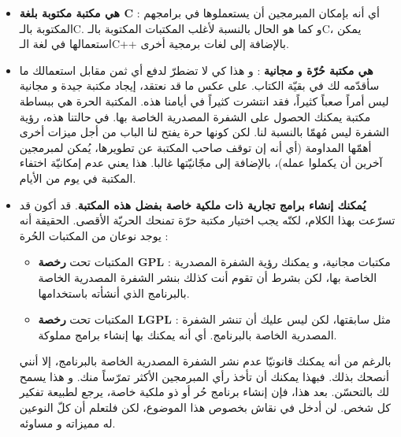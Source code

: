 \begin{itemize}
	\item \textbf{هي مكتبة مكتوبة بلغة
	\textenglish{C}} :
	 أي أنه بإمكان المبرمجين أن يستعملوها في برامجهم المكتوبة بالـ\textenglish{C}.
	 و كما هو الحال بالنسبة لأغلب المكتبات المكتوبة بالـ\textenglish{C}،
	 يمكن استعمالها في لغة الـ\textenglish{C++}
	 بالإضافة إلى لغات برمجية أخرى.
	 \item \textbf{هي مكتبة حُرّة و مجانية} :
و هذا كي لا تضطرّ لدفع أي ثمن مقابل استعمالك ما سأقدّمه لك في بقيّة الكتاب. على عكس ما قد نعتقد، إيجاد مكتبة جيدة و مجانية ليس أمراً صعباً كثيراً، فقد انتشرت كثيراً في أيامنا هذه. المكتبة الحرة هي ببساطة مكتبة يمكنك الحصول على الشفرة المصدرية الخاصة بها. في حالتنا هذه، رؤية الشفرة ليس مُهمّا بالنسبة لنا. لكن كونها حرة يفتح لنا الباب من أجل ميزات أخرى أهمّها المداومة (أي أنه إن توقف صاحب المكتبة عن تطويرها، يُمكن لمبرمجين آخرين أن يكملوا عمله)، بالإضافة إلى مجّانيّتها غالبا. هذا يعني عدم إمكانيّة اختفاء المكتبة في يوم من الأيام.
	 \item \textbf{يُمكنك إنشاء برامج تجارية ذات ملكية خاصة بفضل هذه المكتبة}.
	 قد أكون قد تسرّعت بهذا الكلام، لكنّه يجب اختيار مكتبة حرّة تمنحك الحريّة الأقصى. الحقيقة أنه يوجد نوعان من المكتبات الحُرة :
	 
	 \begin{itemize}
	 	\item المكتبات تحت 
	 	\textbf{رخصة \textenglish{GPL}} :
	 	 مكتبات مجانية، و يمكنك رؤية الشفرة المصدرية الخاصة بها، لكن بشرط أن تقوم أنت كذلك بنشر الشفرة المصدرية الخاصة بالبرنامج الذي أنشأته باستخدامها.
	 	\item المكتبات تحت 
	 	\textbf{رخصة \textenglish{LGPL}} :
	 	مثل سابقتها، لكن ليس عليك أن تنشر الشفرة المصدرية الخاصة بالبرنامج. أي أنه يمكنك بها إنشاء برامج مملوكة.
	 \end{itemize}
 	
 	\begin{information}
بالرغم من أنه يمكنك قانونيّا عدم نشر الشفرة المصدرية الخاصة بالبرنامج، إلا أنني أنصحك بذلك. فبهذا يمكنك أن تأخذ رأي المبرمجين الأكثر تمرّساً منك. و هذا يسمح لك بالتحسّن. بعد هذا، فإن إنشاء برنامج حُر أو ذو ملكية خاصة، يرجع لطبيعة تفكير كل شخص. لن أدخل في نقاش بخصوص هذا الموضوع، لكن فلتعلم أن كلّ النوعين له مميزاته و مساوئه.
 	\end{information}


\end{itemize}
